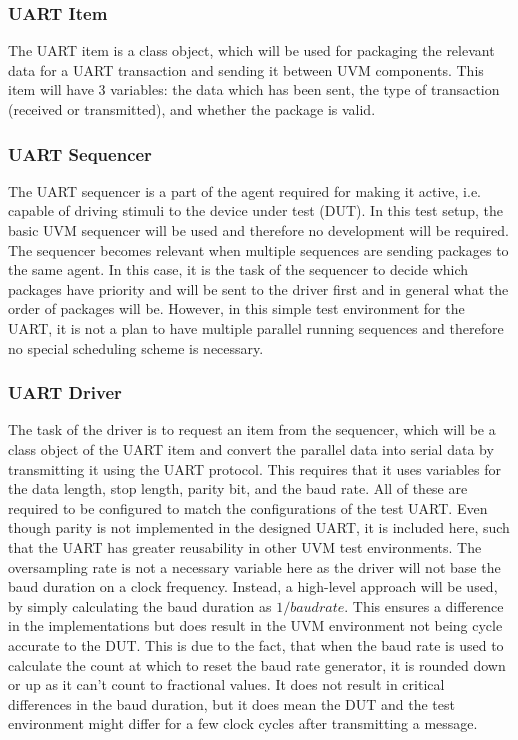 \documentclass[./dissertation.tex]{subfiles}
\begin{document}
\subsubsection{UART Item}
The UART item is a class object, which will be used for packaging the relevant data for a UART transaction and sending it between UVM components. This item will have 3 variables: the data which has been sent, the type of transaction (received or transmitted), and whether the package is valid. 

\subsubsection{UART Sequencer}
The UART sequencer is a part of the agent required for making it active, i.e. capable of driving stimuli to the device under test (DUT). In this test setup, the basic UVM sequencer will be used and therefore no development will be required. The sequencer becomes relevant when multiple sequences are sending packages to the same agent. In this case, it is the task of the sequencer to decide which packages have priority and will be sent to the driver first and in general what the order of packages will be. However, in this simple test environment for the UART, it is not a plan to have multiple parallel running sequences and therefore no special scheduling scheme is necessary. 

\subsubsection{UART Driver}
The task of the driver is to request an item from the sequencer, which will be a class object of the UART item and convert the parallel data into serial data by transmitting it using the UART protocol. This requires that it uses variables for the data length, stop length, parity bit, and the baud rate. All of these are required to be configured to match the configurations of the test UART. Even though parity is not implemented in the designed UART, it is included here, such that the UART has greater reusability in other UVM test environments. The oversampling rate is not a necessary variable here as the driver will not base the baud duration on a clock frequency. Instead, a high-level approach will be used, by simply calculating the baud duration as $1/baudrate$. This ensures a difference in the implementations but does result in the UVM environment not being cycle accurate to the DUT. This is due to the fact, that when the baud rate is used to calculate the count at which to reset the baud rate generator, it is rounded down or up as it can't count to fractional values. It does not result in critical differences in the baud duration, but it does mean the DUT and the test environment might differ for a few clock cycles after transmitting a message. 
\end{document}
